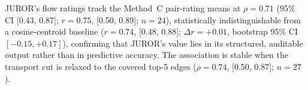 \newcommand{\ci}[2]{#1 \scriptsize{[#2]}}


JUROR's flow ratings track the Method~C pair-rating means at
$\rho=0.71$ (95\% CI [0.43, 0.87]; $r=0.75$, [0.50, 0.89]; $n=24$),
statistically indistinguishable from a cosine-centroid baseline
($r=0.74$, [0.48, 0.88]; $\Delta r=+0.01$, bootstrap 95\% CI $[-0.15,+0.17]$),
confirming that JUROR's value lies in its structured, auditable output rather than
in predictive accuracy. The association is stable when the transport cut is relaxed
to the covered top-5 edges ($\rho=0.74$, [0.50, 0.87]; $n=27$).
